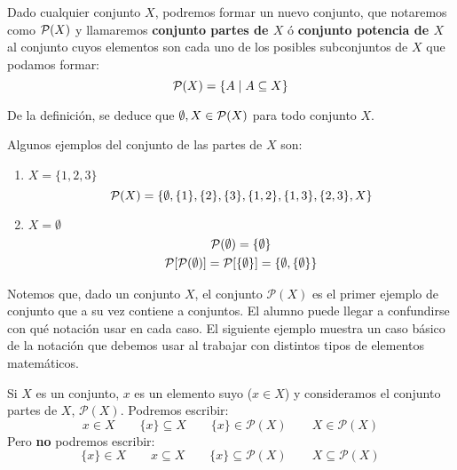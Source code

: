 \begin{definicion}
    Dado cualquier conjunto $X$, podremos formar un nuevo conjunto, que notaremos como $\mathcal{P}(X)$ y llamaremos \textbf{conjunto partes de $X$} ó \textbf{conjunto potencia de $X$} al conjunto cuyos elementos son cada uno de los posibles subconjuntos de $X$ que podamos formar:
    $$\mathcal{P}(X) = \{A \mid A \subseteq X\}$$
\end{definicion}
De la definición, se deduce que $\emptyset,X\in \mathcal{P}(X)$ para todo conjunto $X$.

\begin{ejemplo} Algunos ejemplos del conjunto de las partes de $X$ son:
\begin{enumerate}
    \item $X = \{1, 2, 3\}$
    $$\mathcal{P}(X) = \{\emptyset, \{1\}, \{2\}, \{3\}, \{1, 2\}, \{1, 3\}, \{2, 3\}, X\}$$

    \item $X=\emptyset$
    \begin{gather*}
        \mathcal{P}(\emptyset)=\{\emptyset\}\\
        \mathcal{P}[\mathcal{P}(\emptyset)] = \mathcal{P}[\{\emptyset\}] = \{\emptyset, \{\emptyset\}\}
    \end{gather*}
\end{enumerate}
\end{ejemplo}

Notemos que, dado un conjunto $X$, el conjunto $\mathcal{P}(X)$ es el primer ejemplo de conjunto que a su vez contiene a conjuntos. El alumno puede llegar a confundirse con qué notación usar en cada caso. El siguiente ejemplo muestra un caso básico de la notación que debemos usar al trabajar con distintos tipos de elementos matemáticos.

\begin{ejemplo}
    Si $X$ es un conjunto, $x$ es un elemento suyo ($x\in X$) y consideramos el conjunto partes de $X$, $\mathcal{P}(X)$. Podremos escribir:
    \begin{equation*}
        x\in X \qquad \{x\} \subseteq X \qquad \{x\} \in  \mathcal{P}(X) \qquad X \in \mathcal{P}(X)
    \end{equation*}
    Pero \textbf{no} podremos escribir:
    \begin{equation*}
        \{x\} \in X \qquad x \subseteq X \qquad \{x\} \subseteq \mathcal{P}(X) \qquad X \subseteq \mathcal{P}(X)
    \end{equation*}
\end{ejemplo}

